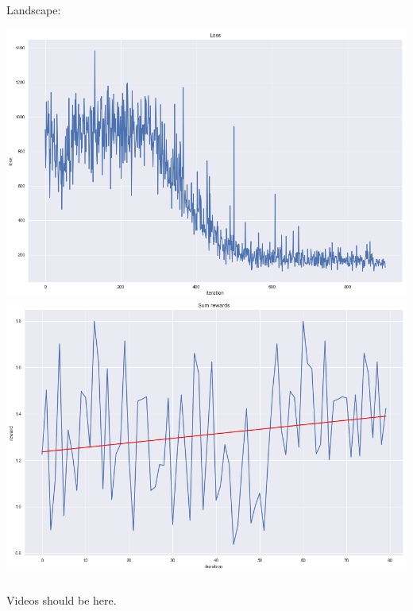 \documentclass[t]{beamer}
\begin{document}
\begin{frame}
	\frametitle{\insertsection}
	Landscape:

	\includegraphics[height=0.43\textheight]{images/landscape_loss.png}
	\includegraphics[height=0.43\textheight]{images/landscape_rewards.png}
\end{frame}

\begin{frame}
	\frametitle{\insertsection}
	Videos should be here.
\end{frame}
\end{document}
